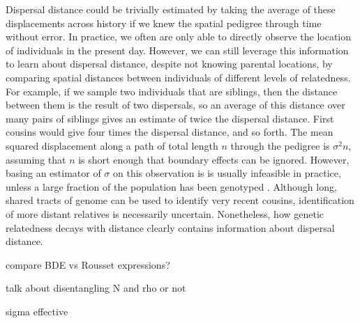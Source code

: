\documentclass{ar-1col}
\newcommand{\plr}[1]{{\color{green}{#1}}}
\begin{document}
Dispersal distance could be trivially estimated by taking
the average of these displacements across history
if we knew the spatial pedigree through time without error.
In practice, we often are only able to directly observe
the location of individuals in the present day.
However, we can still leverage this information to learn about dispersal distance,
despite not knowing parental locations, 
by comparing spatial distances between individuals of different levels of relatedness.
For example, if we sample two individuals that are siblings,
then the distance between them is the result of two dispersals,
so an average of this distance over many pairs of siblings 
gives an estimate of twice the dispersal distance.
First cousins would give four times the dispersal distance, and so forth.
The mean squared displacement along
a path of total length $n$ through the pedigree is $\sigma^2 n$,
assuming that $n$ is short enough that boundary effects can be ignored.
However, basing an estimator of $\sigma$ on this observation
is is usually infeasible in practice,
unless a large fraction of the population has been genotyped
\citep[e.g.,][]{Aguillon2017deconstructing}.
Although long, shared tracts of genome can be used to identify very recent cousins,
identification of more distant relatives is necessarily uncertain.
Nonetheless, how genetic relatedness decays with distance
clearly contains information about dispersal distance.


compare BDE vs Rousset expressions?

talk about disentangling N and rho or not

sigma effective



\end{document}
